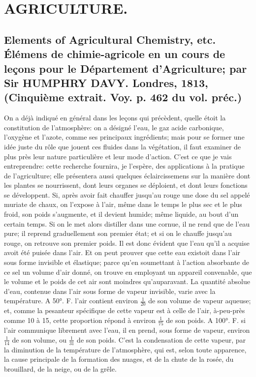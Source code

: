 \setcounter{page}{3}
\chapter{AGRICULTURE.}
\section{Elements of Agricultural Chemistry, etc. Élémens de chimie-agricole en un cours de leçons pour le Département d'Agriculture; par Sir HUMPHRY DAVY. Londres, 1813, \large{(Cinquième extrait. Voy. p. 462 du vol. préc.)}}
On a déjà indiqué en général dans les leçons qui précèdent, quelle étoit la constitution de l'atmosphère: on a désigné l'eau, le gaz acide carbonique, l'oxygène et l'azote, comme ses principaux ingrédients; mais pour se former une idée juste du rôle que jouent ces fluides dans la végétation, il faut examiner de plus près leur nature particulière et leur mode d'action. C'est ce que je vais entreprendre: cette recherche fournira, je l'espère, des applications à la pratique de l'agriculture; elle présentera aussi quelques éclaircissemens sur la manière dont les plantes se nourrissent, dont leurs organes se déploient, et dont leurs fonctions se développent.\setcounter{page}{4} Si, après avoir fait chauffer jusqu'au rouge une dose du sel appelé muriate de chaux, on l'expose à l'air, même dans le temps le plus sec et le plus froid, son poids s'augmente, et il devient humide; même liquide, au bout d'un certain temps. Si on le met alors distiller dans une cornue, il ne rend que de l'eau pure; il reprend graduellement son premier état; et si on le chauffe jusqu'au rouge, on retrouve son premier poids. Il est donc évident que l'eau qu'il a acquise avoit été puisée dans l'air. Et on peut prouver que cette eau existoit dans l'air sous forme invisible et élastique; parce qu'en soumettant à l'action absorbante de ce sel un volume d'air donné, on trouve en employant un appareil convenable, que le volume et le poids de cet air sont moindres qu'auparavant.
La quantité absolue d'eau, contenue dans l'air sous forme de vapeur invisible, varie avec la température. A 50°. F. l'air contient environ $\frac{1}{20}$ de son volume de vapeur aqueuse; et, comme la pesanteur spécifique de cette vapeur est à celle de l'air, à-peu-près comme 10 à 15, cette proportion répond à environ $\frac{1}{75}$ de son poids.
A 100°. F. si l'air communique librement avec l'eau, il en prend, sous forme de vapeur,\setcounter{page}{5} environ $\frac{1}{14}$ de son volume, ou $\frac{1}{31}$ de son poids. C'est la condensation de cette vapeur, par la diminution de la température de l'atmosphère, qui est, selon toute apparence, la cause principale de la formation des nuages, et de la chute de la rosée, du brouillard, de la neige, ou de la grêle.
